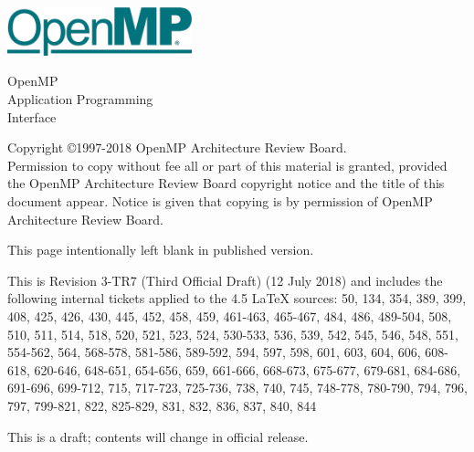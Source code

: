 
  \begin{titlepage}
    \begin{flushleft}
     \hspace{-6em} \includegraphics[width=0.4\textwidth]{openmp-logo.png}
    \end{flushleft}

    \begin{adjustwidth}{-0.75in}{0in}
    \begin{center}
      \Huge
      \textsf{OpenMP\\Application Programming\\Interface}

      \vspace{0.5in}\textsf{    }\vspace{-0.7in}
      \normalsize

      \vspace{1.0in}

      \textbf{\ompversion{}}
    \end{center}
    \end{adjustwidth}

    \vspace{3.0in}

\begin{adjustwidth}{0pt}{1em}\setlength{\parskip}{0.25\baselineskip}%
Copyright \copyright 1997-2018 OpenMP Architecture Review Board.\\
Permission to copy without fee all or part of this material is granted,
provided the OpenMP Architecture Review Board copyright notice and
the title of this document appear. Notice is given that copying is by
permission of OpenMP Architecture Review Board.\end{adjustwidth}

  \end{titlepage}


\clearpage
\thispagestyle{empty}
\phantom{a}
This page intentionally left blank in published version.

This is Revision 3-TR7 (Third Official Draft) (12 July 2018) and
includes the following internal tickets applied to the 4.5 LaTeX sources:
50, 134, 354, 389, 399, 408, 425, 426, 430, 445, 452, 458, 459, 461-463, 
465-467, 484, 486, 489-504, 508, 510, 511, 514, 518, 520, 521, 523, 
524, 530-533, 536, 539, 542, 545, 546, 548, 551, 554-562, 564, 568-578, 
581-586, 589-592, 594, 597, 598, 601, 603, 604, 606, 608-618, 620-646, 
648-651, 654-656, 659, 661-666, 668-673, 675-677, 679-681, 684-686, 
691-696, 699-712, 715, 717-723, 725-736, 738, 740, 745, 748-778, 780-790, 
794, 796, 797, 799-821, 822, 825-829, 831, 832, 836, 837, 840, 844

This is a draft; contents will change in official release.

\vfill


